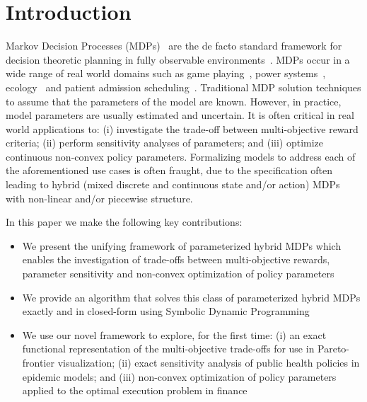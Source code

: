 \section{Introduction}
\label{sec:introduction}

Markov Decision Processes (MDPs)~\parencite{Howard_MIT_1960} are the de facto standard framework for decision theoretic
planning in fully observable environments~\parencite{Boutilier_JAIR_1999}. MDPs occur in a wide range of real world domains such as game playing~\parencite{Szita_RL_2012}, power systems~\parencite{Reddy_IJCAI_2011}, ecology~\parencite{Williams_EM_2009} and patient admission scheduling~\parencite{Zhu_AIM_2014}. Traditional MDP solution techniques to assume that the parameters of the model are known. However, in practice, model parameters are usually estimated and uncertain. It is often critical in real world applications to: (i) investigate the trade-off between multi-objective reward criteria; (ii) perform sensitivity analyses of parameters; and (iii) optimize continuous non-convex policy parameters. Formalizing models to address each of the aforementioned use cases is often fraught, due to the specification often leading to hybrid (mixed discrete and continuous state and/or action) MDPs with non-linear and/or piecewise structure. 

In this paper we make the following key contributions:
\begin{itemize}
    \item We present the unifying framework of parameterized hybrid MDPs which enables the investigation of trade-offs between multi-objective rewards, parameter sensitivity and non-convex optimization of policy parameters
    \item We provide an algorithm that solves this class of parameterized hybrid MDPs exactly and in closed-form using Symbolic Dynamic Programming~\parencite{Boutilier_IJCAI_2001}
    \item We use our novel framework to explore, for the first time: (i) an exact functional representation of the multi-objective trade-offs for use in Pareto-frontier visualization; (ii) exact sensitivity analysis of public health policies in epidemic models; and (iii) non-convex optimization of policy parameters applied to the optimal execution problem in finance
\end{itemize}

